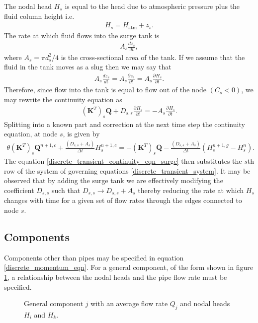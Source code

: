\documentclass[12pt]{article}
\newcommand{\pardiv}[3]{\frac{\partial^{#1} #2}{\partial #3^{#1}}}
\begin{document}
The nodal head $H_s$ is equal to the head due to atmospheric pressure plus the fluid column height i.e.
\begin{align}
H_s = H_{\text{atm}} + z_s.
\end{align} 
The rate at which fluid flows into the surge tank is
\begin{align*}
A_s \frac{d z_s}{d t},
\end{align*}
where $A_s = \pi d_s^2 / 4$ is the cross-sectional area of the tank. If we assume that the fluid in the tank moves as a slug then we may say that
 \begin{align*}
A_s \frac{d z_s}{d t} = A_s \pardiv{}{z_s}{t} = A_s \pardiv{}{H_s}{t}.
\end{align*}
Therefore, since flow into the tank is equal to flow out of the node $(C_s < 0)$, we may rewrite the continuity equation as
\begin{align*}
\left( \mathbf{K}^T \right)_s \mathbf{Q} + D_{s,s} \pardiv{}{H_s}{t} = - A_s \pardiv{}{H_s}{t}.
\end{align*}
Splitting into a known part and correction at the next time step the continuity equation, at node $s$, is given by
\begin{align}\label{discrete_transient_continuity_eqn_surge}
\theta \left( \mathbf{K}^T \right)_s \mathbf{Q}^{n+1,c} + \frac{(D_{s,s} + A_s)}{\Delta t} H_s^{n+1,c} = - \left( \mathbf{K}^T \right)_s \bar{\mathbf{Q}} - \frac{(D_{s,s} + A_s)}{\Delta t} \left( H_s^{n+1,g} - H_s^{n} \right).
\end{align}
The equation \eqref{discrete_transient_continuity_eqn_surge} then substitutes the $s$th row of the system of governing equations \eqref{discrete_transient_system}. It may be observed that by adding the surge tank we are effectively modifying the coefficient $D_{s,s}$ such that $D_{s,s} \rightarrow D_{s,s} + A_s$ thereby reducing the rate at which $H_s$ changes with time for a given set of flow rates through the edges connected to node $s$. 

\subsection{Components}

Components other than pipes may be specified in equation \eqref{discrete_momentum_eqn}. For a general component, of the form shown in figure \ref{fig:general_component}, a relationship between the nodal heads and the pipe flow rate must be specified. 

\begin{figure}
\centering
{} 
\caption{General component $j$ with an average flow rate $Q_j$ and nodal heads $H_i$ and $H_k$.}
\label{fig:general_component}
\end{figure}
\end{document}
